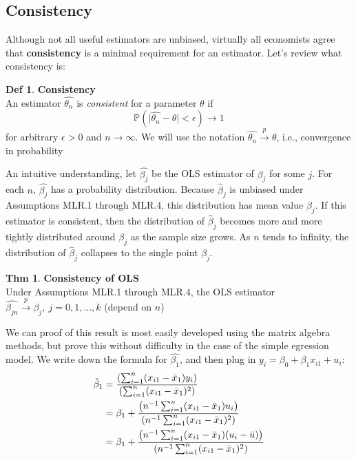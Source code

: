 \documentclass[a4paper, 10pt]{article}
\theoremstyle{definition}	%
\newtheorem{theorem}{Thm}
\newtheorem*{definition}{Def}
\begin{document}
\subsection{Consistency}
Although not all useful estimators are unbiased, virtually all economists agree that \textbf{consistency} is a minimal requirement for an estimator. Let's review what  consistency is:
\begin{definition}
    \textbf{Consistency}\\
    An estimator $\hat{\theta_n}$ is \textit{consistent} for a parameter $\theta$ if 
    $$\mathbb{P}(\lvert\hat{\theta_n} - \theta \rvert < \epsilon) \rightarrow 1 $$ 
    for arbitrary $\epsilon > 0$ and $n\rightarrow \infty$. We will use the notation 
    $\hat{\theta_n} \xrightarrow{p} \theta$, i.e., convergence in probability
\end{definition}
An intuitive understanding, let $\hat{\beta_j}$ be the OLS estimator of $\beta_j$ for some $j$. For each $n$, $\hat{\beta_j}$ has a probability distribution. Because $\hat{\beta}_j$ is unbiased under Assumptions MLR.1 through MLR.4, this distribution has mean value $\beta_j$. If this estimator is consistent, then the distribution of $\hat{\beta}_j$ becomes more and more tightly distributed around $\beta_j$ as the sample size grows. As $n$ tends to infinity, the distribution of $\hat{\beta}_j$ collapses to the single point $\beta_j$. 
\begin{theorem}
    \textbf{Consistency of OLS}\\
    Under Assumptions MLR.1 through MLR.4, the OLS estimator 
    $\hat{\beta_{jn}} \xrightarrow{p} \beta_j,\ j=0, 1, \ldots, k$ (depend on $n$)
\end{theorem}
We can proof of this result is most easily developed using the matrix algebra methods, but 
prove this without difficulty in the case of the simple egression model. We write down the formula for $\hat{\beta_1}$, and then plug in $y_i = \beta_0 + \beta_1 x_{i1} + u_i$:
\begin{align}
    \hat{\beta}_1 &= \frac{\left( \sum_{i=1}^n (x_{i1} - \bar{x}_1) y_i \right)}
{\left( \sum_{i=1}^n (x_{i1} - \bar{x}_1)^2 \right)} \notag \\
&= \beta_1 + \frac{\left( n^{-1} \sum_{i=1}^n (x_{i1} - \bar{x}_1) u_i \right)}
{\left( n^{-1} \sum_{i=1}^n (x_{i1} - \bar{x}_1)^2 \right)} \notag \\
    &= \beta_1 + \frac{\left( n^{-1} \sum_{i=1}^n (x_{i1} - \bar{x}_1) (u_i - \bar{u}) \right)}{\left( n^{-1} \sum_{i=1}^n (x_{i1} - \bar{x}_1)^2 \right)} \label{eq:p.165,5.2} 
\end{align} 
\end{document}
